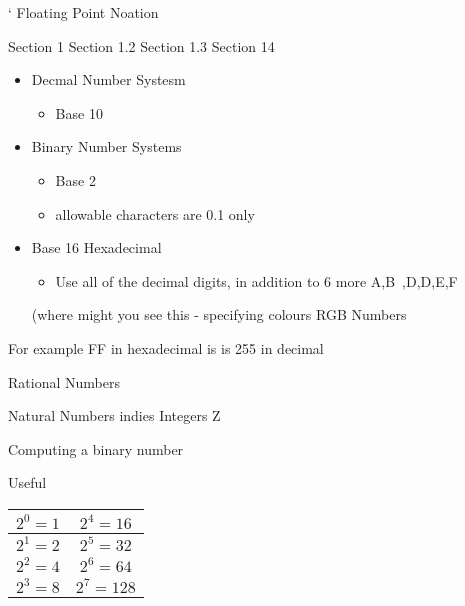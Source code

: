 \documentclass[]{report}
\begin{document}

`
Floating Point Noation

Section 1
Section 1.2
Section 1.3
Section 14

\begin{itemize}
	\item Decmal Number Systesm
	\begin{itemize}
		\item Base 10
	\end{itemize}
	
	\item Binary Number Systems
	\begin{itemize}
		\item Base 2
		\item allowable characters are {0.1} only
	\end{itemize}
	\item Base 16 Hexadecimal
	\begin{itemize}
		\item Use all of the decimal digits, in addition to 6 more A,B~,D,D,E,F
	\end{itemize}
	(where might you see this  - specifying colours RGB Numbers
\end{itemize}

For example FF in hexadecimal is is 255 in decimal 


Rational Numbers

Natural Numbers indies
Integers Z



Computing a binary number

Useful
{
	\begin{center}
		\begin{tabular}{|c|c|}
			\hline $2^0 = 1 $ & $2^4 = 16  $ \\ 
			\hline $2^1 = 2 $ & $2^5 = 32$ \\ 
			\hline $2^2 = 4 $ & $2^6 = 64$ \\ 
			\hline $2^3 = 8 $ & $ 2^7 = 128$ \\ 
			\hline 
		\end{tabular} 
	\end{center}
}


\newpage
\end{document}
